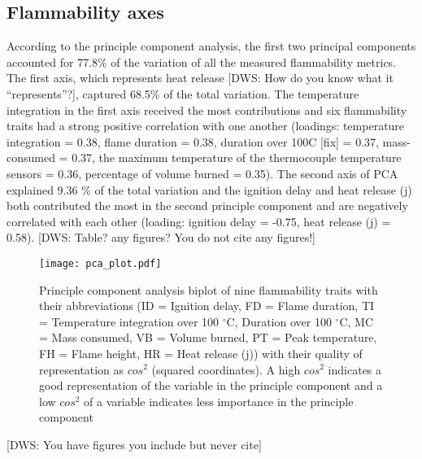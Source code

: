 \documentclass[12pt]{report}
\begin{document}
\subsection{Flammability axes}
According to the principle component analysis, the first two principal components accounted for 77.8\% of the variation of all the measured flammability metrics. The first axis, which represents heat release [DWS: How do you know what it ``represents''?], captured 68.5\% of the total variation. The temperature integration in the first axis received the most contributions and six flammability traits had a strong positive correlation with one another (loadings: temperature integration = 0.38, flame duration = 0.38, duration over 100C [fix] = 0.37, mass-consumed = 0.37, the maximum temperature of the thermocouple temperature sensors = 0.36, percentage of volume burned = 0.35). The second axis of PCA explained 9.36 \% of the total variation and the ignition delay and heat release (j) both contributed the most in the second principle component and are negatively correlated with each other (loading: ignition delay = -0.75, heat release (j) = 0.58). [DWS: Table? any figures? You do not cite any figures!]

\begin{figure}  %
    \centering
    \texttt{[image: pca\_plot.pdf]}
    \caption{Principle component analysis biplot of nine flammability traits with their abbreviations (ID = Ignition delay, FD = Flame duration, TI = Temperature integration over 100 $^{\circ}$C, Duration over 100 $^{\circ}$C, MC = Mass consumed, VB = Volume burned, PT = Peak temperature, FH = Flame height, HR = Heat release (j)) with their quality of representation as $cos^2$ (squared coordinates). A high $cos^2$ indicates a good representation of the variable in the principle component and a low $cos^2$ of a variable indicates less importance in the principle component}
  \end{figure}

  [DWS: You have figures you include but never cite]
\end{document}
